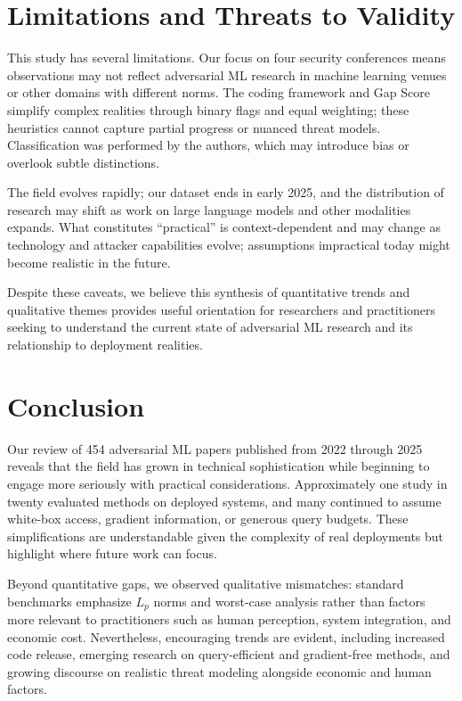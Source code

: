 \documentclass[11pt,a4paper]{article}
\begin{document}
\section{Limitations and Threats to Validity}

This study has several limitations. Our focus on four security conferences means observations may not reflect adversarial ML research in machine learning venues or other domains with different norms. The coding framework and Gap Score simplify complex realities through binary flags and equal weighting; these heuristics cannot capture partial progress or nuanced threat models. Classification was performed by the authors, which may introduce bias or overlook subtle distinctions.

The field evolves rapidly; our dataset ends in early 2025, and the distribution of research may shift as work on large language models and other modalities expands. What constitutes ``practical'' is context-dependent and may change as technology and attacker capabilities evolve; assumptions impractical today might become realistic in the future.

Despite these caveats, we believe this synthesis of quantitative trends and qualitative themes provides useful orientation for researchers and practitioners seeking to understand the current state of adversarial ML research and its relationship to deployment realities.

\section{Conclusion}

Our review of 454 adversarial ML papers published from 2022 through 2025 reveals that the field has grown in technical sophistication while beginning to engage more seriously with practical considerations. Approximately one study in twenty evaluated methods on deployed systems, and many continued to assume white-box access, gradient information, or generous query budgets. These simplifications are understandable given the complexity of real deployments but highlight where future work can focus.

Beyond quantitative gaps, we observed qualitative mismatches: standard benchmarks emphasize $L_p$ norms and worst-case analysis rather than factors more relevant to practitioners such as human perception, system integration, and economic cost. Nevertheless, encouraging trends are evident, including increased code release, emerging research on query-efficient and gradient-free methods, and growing discourse on realistic threat modeling alongside economic and human factors.
\end{document}
